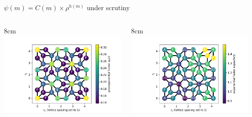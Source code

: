 \documentclass[xcolor=x11names,compress,professionalfonts, aspectratio=169]{beamer}
\renewcommand{\(}{\begin{columns}}
\renewcommand{\)}{\end{columns}}
\newcommand{\<}[1]{\begin{column}{#1}}
\renewcommand{\>}{\end{column}}
\begin{document}
\begin{frame}{$\psi(m) = C(m) \times \rho^{h(m)}$ under scrutiny}

\begin{columns}
\<{8cm}
\centering
\includegraphics[scale=.5]{img/SKK_cake_2_para.pdf}
\>
\<{8cm}
\centering
\includegraphics[scale=.5]{img/SKK_exponential_2_para.pdf}
\>
\end{columns}

\newcommand{\s}{.11}
{

\centering

}
\end{frame}
\end{document}
